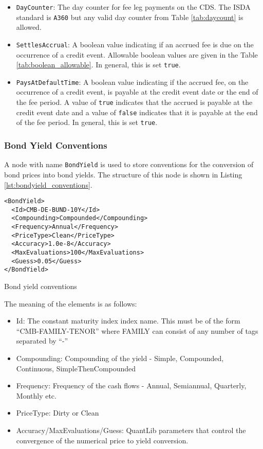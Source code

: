 \begin{itemize}
\item \lstinline!DayCounter!:
The day counter for fee leg payments on the CDS. The ISDA standard is \lstinline!A360! but any valid day counter from Table \ref{tab:daycount} is allowed.

\item \lstinline!SettlesAccrual!:
A boolean value indicating if an accrued fee is due on the occurrence of a credit event. Allowable boolean values are given in the Table \ref{tab:boolean_allowable}. In general, this is set \lstinline!true!.

\item \lstinline!PaysAtDefaultTime!:
A boolean value indicating if the accrued fee, on the occurrence of a credit event, is payable at the credit event date or the end of the fee period. A value of \lstinline!true! indicates that the accrued is payable at the credit event date and a value of \lstinline!false! indicates that it is payable at the end of the fee period. In general, this is set \lstinline!true!.

\end{itemize}



\subsubsection{Bond Yield Conventions}
A node with name \lstinline!BondYield! is used to store conventions for the conversion
of bond prices into bond yields.
The structure of this node is shown in Listing \ref{lst:bondyield_conventions}.

\begin{listing}[H]
\begin{verbatim}
<BondYield>
  <Id>CMB-DE-BUND-10Y</Id>
  <Compounding>Compounded</Compounding>
  <Frequency>Annual</Frequency>
  <PriceType>Clean</PriceType>
  <Accuracy>1.0e-8</Accuracy>
  <MaxEvaluations>100</MaxEvaluations>
  <Guess>0.05</Guess>
</BondYield>
\end{verbatim}
\caption{Bond yield conventions}
\label{lst:bondyield_conventions}
\end{listing}

The meaning of the elements is as follows:

\begin{itemize}
\item Id: The constant maturity index index name. This must be of the form ``CMB-FAMILY-TENOR'' where FAMILY can consist of any number of tags separated by ``-''
\item Compounding: Compounding of the yield - Simple, Compounded, Continuous, SimpleThenCompounded
\item Frequency: Frequency of the cash flows - Annual, Semiannual, Quarterly, Monthly etc.
\item PriceType: Dirty or Clean
\item Accuracy/MaxEvaluations/Guess: QuantLib parameters that control the convergence of the numerical price to yield conversion. 
\end{itemize}


